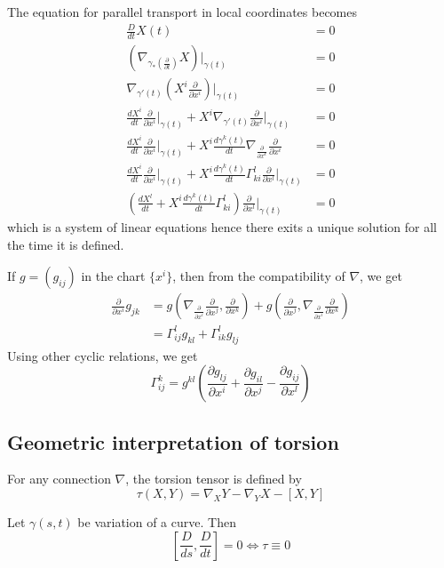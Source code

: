 \documentclass[12pt,a4paper]{article}
\theoremstyle{definition}
\theoremstyle{greenbox}
\newcommand{\dohi}{\frac{\partial}{\partial x^i}}
\newcommand{\dohj}{\frac{\partial}{\partial x^j}}
\newcommand{\dohk}{\frac{\partial}{\partial x^k}}
\begin{document}
    The equation for parallel transport in local coordinates becomes 
    \begin{align}
        \frac{D}{dt} X(t) & =0 \\
        \left( \nabla_{\gamma_{*}( \frac{ \partial}{ \partial t})}X \right)\bigg|_{\gamma(t)} & = 0 \\
        \nabla_{\gamma'(t)}\left( X^{i} \dohi \right)\bigg|_{\gamma(t)} & =0\\ 
        \frac{dX^{i}}{dt} \dohi\bigg|_{\gamma(t)} + X^{i}\nabla_{\gamma'(t)}\dohi\bigg|_{\gamma(t)} & = 0\\ 
        \frac{dX^{i}}{dt} \dohi\bigg|_{\gamma(t)} +X^{i} \frac{d\gamma^{k}(t)}{dt} \nabla_{\frac{ \partial}{ \partial x^{k}}}\frac{ \partial}{ \partial x^{i}} & = 0\\
        \frac{dX^{i}}{dt} \dohi\bigg|_{\gamma(t)} +X^{i} \frac{d\gamma^{k}(t)}{dt} \Gamma_{ki}^{l} \frac{ \partial}{ \partial x^{l}}\bigg|_{\gamma(t)} &  = 0\\ 
        \left( \frac{dX^{l}}{dt} +X^{i} \frac{d\gamma^{k}(t)}{dt} \Gamma_{ki}^{l}\right)\frac{ \partial}{ \partial x^{l}}\bigg|_{\gamma(t)} & =0 \label{parallel}
    \end{align}
    which is a system of linear equations hence there exits a unique solution for all the time it is defined. 
    
    If $ g = (g_{ij}) $ in the chart $ \{x^{i}\} $, then from the compatibility of $ \nabla $, we get 
    \begin{align*}
        \dohi g_{jk} &= g\left(\nabla_{\dohi} \dohj, \dohk\right)+ g\left(\dohj, \nabla_{\dohi}\dohk\right)\\ 
        & = \Gamma_{ij}^{l}g_{kl}+ \Gamma_{ik}^{l}g_{lj}
    \end{align*}
    Using other cyclic relations, we get 
    \[ \Gamma_{ij}^{k} = g^{kl}\left(\frac{ \partial g_{lj}}{ \partial x^{i}} + \frac{ \partial g_{il}}{ \partial x^{j}} - \frac{ \partial g_{ij}}{ \partial x^{l}}\right) \]
    
    \subsection*{Geometric interpretation of torsion}   
    
    For any connection $ \nabla $, the torsion tensor is defined by 
    \[ \tau(X,Y) = \nabla_{X}Y - \nabla_{Y}X - [X,Y]\]
    
    Let $ \gamma(s,t) $ be variation of a curve. Then 
    \[ \left[ \frac{D}{ds}, \frac{D}{dt}\right] = 0 \Longleftrightarrow \tau \equiv 0 \]
    
\end{document}
